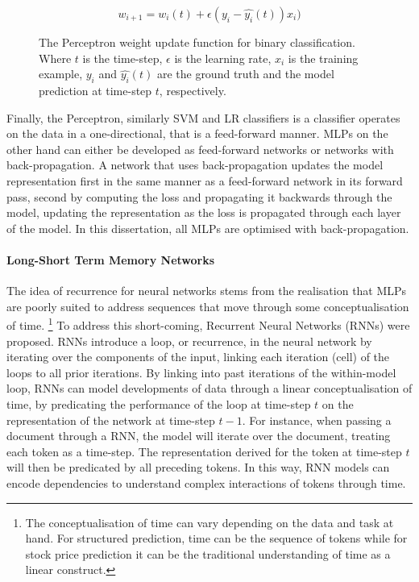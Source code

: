 \begin{figure}[h]
  \begin{equation}\label{eq:perceptron_update}
    w_{i+1} = w_i(t) + \epsilon (y_i - \hat{y_i}(t))x_{i})
  \end{equation}
  \caption[The Perceptron weight update function.]{The Perceptron weight update function for binary classification. Where $t$ is the time-step, $\epsilon$ is the learning rate, $x_i$ is the training example, $y_i$ and $\hat{y_i}(t)$ are the ground truth and the model prediction at time-step $t$, respectively.}
\end{figure}

Finally, the Perceptron, similarly SVM and LR classifiers is a classifier operates on the data in a one-directional, that is a feed-forward manner. 
MLPs on the other hand can either be developed as feed-forward networks or networks with back-propagation.
A network that uses back-propagation updates the model representation first in the same manner as a feed-forward network in its forward pass, second by computing the loss and propagating it backwards through the model, updating the representation as the loss is propagated through each layer of the model.
In this dissertation, all MLPs are optimised with back-propagation.

\paragraph{Long-Short Term Memory Networks}
The idea of recurrence for neural networks stems from the realisation that MLPs are poorly suited to address sequences that move through some conceptualisation of time.
\footnote{The conceptualisation of time can vary depending on the data and task at hand. For structured prediction, time can be the sequence of tokens while for stock price prediction it can be the traditional understanding of time as a linear construct.}
To address this short-coming, Recurrent Neural Networks (RNNs) were proposed. 
RNNs introduce a loop, or recurrence, in the neural network by iterating over the components of the input, linking each iteration (cell) of the loops to all prior iterations.
By linking into past iterations of the within-model loop, RNNs can model developments of data through a linear conceptualisation of time, by predicating the performance of the loop at time-step $t$ on the representation of the network at time-step $t-1$.
For instance, when passing a document through a RNN, the model will iterate over the document, treating each token as a time-step.
The representation derived for the token at time-step $t$ will then be predicated by all preceding tokens.
In this way, RNN models can encode dependencies to understand complex interactions of tokens through time.

